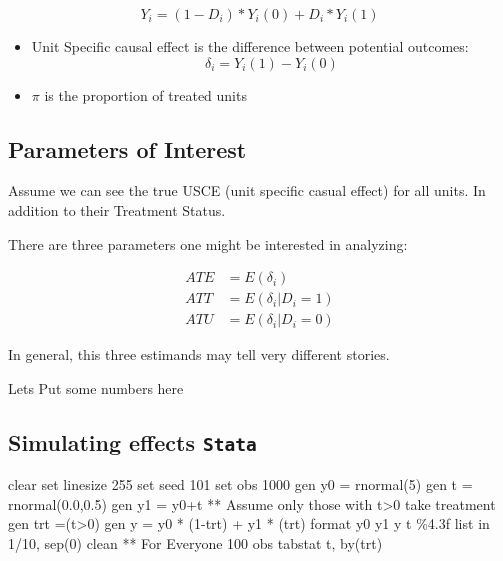 \documentclass[
  letterpaper,
  DIV=11,
  numbers=noendperiod]{scrartcl}
\newenvironment{Shaded}{\begin{snugshade}}{\end{snugshade}}
\newcommand{\DecValTok}[1]{\textcolor[rgb]{0.68,0.00,0.00}{#1}}
\newcommand{\FunctionTok}[1]{\textcolor[rgb]{0.28,0.35,0.67}{#1}}
\newcommand{\KeywordTok}[1]{\textcolor[rgb]{0.00,0.23,0.31}{#1}}
\newcommand{\NormalTok}[1]{\textcolor[rgb]{0.00,0.23,0.31}{#1}}
\newcommand{\OtherTok}[1]{\textcolor[rgb]{0.00,0.23,0.31}{#1}}
\begin{document}
\[Y_i=(1-D_i)*Y_i(0)+D_i*Y_i(1)\]

\begin{itemize}
\item
  Unit Specific causal effect is the difference between potential
  outcomes: \[\delta_i = Y_i(1)-Y_i(0)\]
\item
  \(\pi\) is the proportion of treated units
\end{itemize}

\hypertarget{parameters-of-interest}{%
\subsection{Parameters of Interest}\label{parameters-of-interest}}

Assume we can see the true USCE (unit specific casual effect) for all
units. In addition to their Treatment Status.

There are three parameters one might be interested in analyzing:

\[
\begin{aligned}
ATE &= E(\delta_i) \\
ATT &= E(\delta_i|D_i=1) \\
ATU &= E(\delta_i|D_i=0)
\end{aligned}
\]

In general, this three estimands may tell very different stories.

Lets Put some numbers here

\hypertarget{simulating-effects-stata}{%
\subsection{\texorpdfstring{Simulating effects
\texttt{Stata}}{Simulating effects Stata}}\label{simulating-effects-stata}}

\begin{Shaded}
\begin{Highlighting}[]
\KeywordTok{clear}
\KeywordTok{set} \DecValTok{linesize}\NormalTok{ 255}
\KeywordTok{set} \DecValTok{seed}\NormalTok{ 101}
\KeywordTok{set} \KeywordTok{obs}\NormalTok{ 1000}
\KeywordTok{gen}\NormalTok{ y0 = rnormal(5)}
\KeywordTok{gen}\NormalTok{ t  = rnormal(0.0,0.5)}
\KeywordTok{gen}\NormalTok{ y1 = y0+t}
\NormalTok{** Assume only those with t\textgreater{}0 take treatment}
\KeywordTok{gen}\NormalTok{ trt =(t\textgreater{}0)}
\KeywordTok{gen} \FunctionTok{y}\NormalTok{ = y0 * (1{-}trt) +  y1 * (trt)}
\KeywordTok{format}\NormalTok{ y0 y1 }\FunctionTok{y}\NormalTok{ t \%4.3f }
\OtherTok{list} \KeywordTok{in}\NormalTok{ 1/10, sep(0) }\KeywordTok{clean}
\NormalTok{** For Everyone 100 }\KeywordTok{obs}
\KeywordTok{tabstat}\NormalTok{ t, }\KeywordTok{by}\NormalTok{(trt)}
\end{Highlighting}
\end{Shaded}
\end{document}

